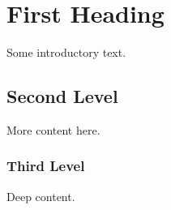 \section{First Heading}
Some introductory text.

\subsection{Second Level}
More content here.

\subsubsection{Third Level}
Deep content.


